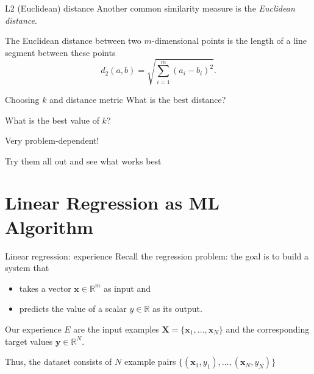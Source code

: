 \documentclass[dvipsnames]{beamer}
\begin{document}
	\begin{frame}{L2 (Euclidean) distance}
			Another common similarity measure is the \emph{Euclidean distance}.
			
			The Euclidean distance between two $m$-dimensional points is the length of a line segment between these points
			\[
			d_2(a,b) = \sqrt{\sum_{i=1}^m(a_i-b_i)^2}.
			\]
	\end{frame}
\begin{frame}{Choosing $k$ and distance metric}
What is the best distance?

What is the best value of $k$? %

Very problem-dependent! %

Try them all out and see what works best
\end{frame}

\section{Linear Regression as ML Algorithm}
		
			\begin{frame}{Linear regression: experience}
			Recall the regression problem: the goal is to build a system that 
			\begin{itemize}
				\item takes a vector $\mathbf{x} \in \mathbb{R}^m$ as input and
				\item predicts the value of a scalar $ y \in \mathbb{R}$ as its output.
			\end{itemize}  %
			
			Our experience $E$ are the input examples $\mathbf{X} = \{\mathbf{x}_1,\dots,\mathbf{x}_N\}$ and the corresponding target values $\mathbf{y} \in \mathbb{R}^N$. %
			
			Thus, the dataset consists of $N$ example pairs $\{(\mathbf{x}_1,y_1), \dots, (\mathbf{x}_N,y_N)\}$ 
			
		\end{frame}
		
\end{document}
